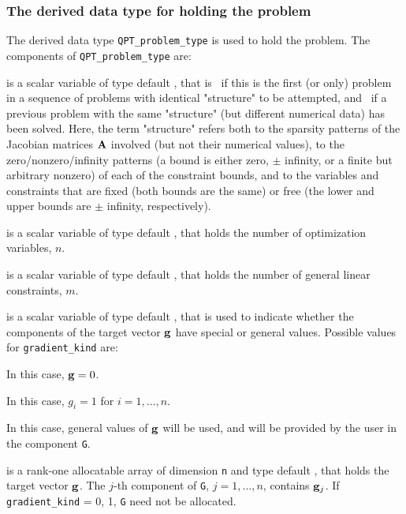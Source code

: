 \documentclass{galahad}
\begin{document}

\subsubsection{The derived data type for holding the problem}\label{typeprob}
The derived data type {\tt QPT\_problem\_type} is used to hold 
the problem. The components of 
{\tt QPT\_problem\_type} 
are:

\begin{description}

 is a scalar variable of type default \logical, 
 that is \true\ if this is the first (or only) problem in a sequence of 
 problems with identical "structure" to be attempted, and \false\ if 
 a previous problem with the same "structure" (but different
 numerical data) has been solved. Here, the term "structure" refers both to 
 the sparsity patterns of the Jacobian matrices ${\mathbf{A}}$ involved 
 (but not their numerical values), to the zero/nonzero/infinity patterns 
 (a bound is either zero, $\pm$ infinity, or a finite but arbitrary 
 nonzero) of each of the constraint bounds, and to the variables and constraints
 that are fixed (both bounds are the same) or free (the lower and upper
 bounds are $\pm$ infinity, respectively).

 is a scalar variable of type default \integer, 
 that holds the number of optimization variables, $n$.  
              
 is a scalar variable of type default \integer, 
 that holds the number of general linear constraints, $m$.
              
 is a scalar variable of type default \integer, 
that is used to indicate whether the components of the target vector ${\mathbf{g}}$ 
have special or general values. Possible values for {\tt gradient\_kind} are:
\begin{description}
  In this case, ${\mathbf{g}} = 0$.

 In this case, $g_{i} = 1$ for $i = 1, \ldots ,n$.

 In this case, general values of ${\mathbf{g}}$ will be used,
     and will be provided by the user in the component {\tt G}.
\end{description}

 is a rank-one allocatable array of dimension {\tt n} and type 
default \realdp, that holds the target vector ${\mathbf{g}}$.
The $j$-th component of 
{\tt G}, $j = 1,  \ldots ,  n$, contains ${\mathbf{g}}_{j}$.
If {\tt gradient\_kind} {= 0, 1}, {\tt G} need not be allocated.


\end{description}
\end{document}

